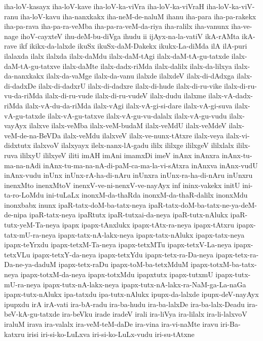 {iha-loV-kasayx
iha-loV-kave
iha-loV-ka-viVra
iha-loV-ka-viVraH
iha-loV-ka-viV-ranu
iha-loV-kavu
iha-nanxkakx
iha-neM-de-naluM
ihanu
iha-para
iha-pa-rakekx
iha-pa-rava
iha-pa-ra-veMba
iha-pa-ra-veM-da-riya
iha-ralilx
iha-vanunx
iha-ve-nage
ihoV-cayxteV
ihu-deM-bu-diVga
ihudu
ii
ijAyx-na-la-vatiV
ikA-rAMta
ikA-rave
ikf
ikikx-da-lalxde
ikuSx
ikuSx-daM-Dakekx
ikukx-La-diMda
ilA
ilA-puri
ilalaxda
ilalx
ilalxda
ilalx-daMdu
ilalx-daM-tAgi
ilalx-daM-tA-gu-tatxde
ilalx-daM-tA-gu-tatxve
ilalx-daMte
ilalx-dadx-riMda
ilalx-dalilx
ilalx-da-lilxya
ilalx-da-nanxkakx
ilalx-da-vaMge
ilalx-da-vanu
ilalxde
ilalxdeV
ilalx-di-dAdxga
ilalx-di-dadxDe
ilalx-di-dadxrU
ilalx-di-dadxre
ilalx-di-hude
ilalx-di-ru-vike
ilalx-di-ru-vu-da-riMda
ilalx-di-ru-vude
ilalx-di-ru-vudeV
ilalx-dudu
ilalxme
ilalx-vA-dadx-riMda
ilalx-vA-du-da-riMda
ilalx-vAgi
ilalx-vA-gi-si-dare
ilalx-vA-gi-suva
ilalx-vA-gu-tatxde
ilalx-vA-gu-tatxve
ilalx-vA-gu-vu-dalalx
ilalx-vA-gu-vudu
ilalx-vayAyx
ilalxve
ilalx-veMba
ilalx-veM-budaM
ilalx-veMdU
ilalx-veMdeV
ilalx-veM-de-na-BeVDa
ilalx-veMdu
ilalxveV
ilalx-ve-nunx-tAtxre
ilalx-veya
ilalx-vi-didxtutx
ilalxvoV
ilalxyayx
ilelx-nanx-lA-gadu
ililx
ililxge
ililxgeV
ililxlalx
ililx-ruva
ililxyU
ililxyeV
iliti
imAH
imAni
imamxDi
imeV
inAnx
inAnxra
inAnx-tu-ma-na-nAdi
inAnx-tu-ma-na-nA-di-paM-ca-ma-la-vi-sAtxra
inAnxva
inAnx-vudU
inAnx-vudu
inUnx
inUnx-rA-ha-di-nAru
inUnxra
inUnx-ra-ha-di-nAru
inUnxru
inenxMto
inenxMtoV
inenxV-ve-ni-nenxV-ve-nayAyx
inf
ininx-vakekx
initU
ini-ta-ro-LoMdu
ini-tuLaLx
inonxM-da-thaRda
inonxM-da-thaR-dalilx
inonxMdu
inonxbabx
inunx
ipaR-tatx-doM-ba-tatx-neya
ipaR-tatx-doM-ba-tatx-ne-ya-deM-de-nipa
ipaR-tatx-neya
ipaRtutx
ipaR-tutxai-da-neya
ipaR-tutx-nAlukx
ipaR-tutx-yeM-Ta-neya
ipapx
ipapx-tAnxlukx
ipapx-tAtx-ra-neya
ipapx-tAtxru
ipapx-tatx-mU-ra-neya
ipapx-tatx-nA-lakx-neya
ipapx-tatx-nAlukx
ipapx-tatx-neya
ipapx-teYrxdu
ipapx-tetxM-Ta-neya
ipapx-tetxMTu
ipapx-tetxV-La-neya
ipapx-tetxVLu
ipapx-tetxY-da-neya
ipapx-tetxYdu
ipapx-tetx-ra-Da-neya
ipapx-tetx-ra-Da-ne-ya-daduM
ipapx-tetx-raDu
ipapx-toM-ba-tetxMduM
ipapx-totxM-ba-tatx-neya
ipapx-totxM-da-neya
ipapx-totxMdu
ipapxtutx
ipapx-tutxmU
ipapx-tutx-mU-ra-neya
ipapx-tutx-nA-lakx-neya
ipapx-tutx-nA-lakx-ra-NaM-ga-La-naGa
ipapx-tutx-nAlukx
ipa-tatxdu
ipa-tutx-nAlukx
ipupx-da-lalxde
ipupx-deV-nayAyx
ipupxdu
irA
irA-vati
ira-bA-radu
ira-ba-hudu
ira-ba-lalxDe
ira-ba-lalx-Deadu
ira-beV-kA-gu-tatxde
ira-beVku
irade
iradeV
irali
ira-liVya
ira-lilalx
ira-li-lalxvoV
iraluM
irava
ira-valalx
ira-veM-teM-daDe
ira-vina
ira-vi-naMte
iravu
iri-Ba-katxru
irisi
iri-si-ko-LuLxva
iri-si-ko-LuLx-vudu
iri-su-tAtxne
}
